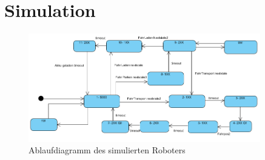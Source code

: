 
\chapter{Simulation}
\label{sec:Simulation}


\begin{figure}[htb]
    \centering
    \includegraphics[width=0.9\textwidth]{Abbildungen/SimulatedRobot.PNG}
    \caption{Ablaufdiagramm des simulierten Roboters}		
    \label{fig:simRobot}
\end{figure}



